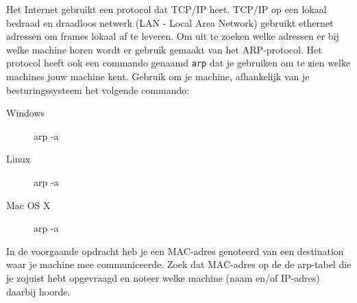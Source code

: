 Het Internet gebruikt een protocol dat TCP/IP heet. TCP/IP op een lokaal bedraad en draadloos netwerk (LAN - Local Area Network) gebruikt ethernet adressen om frames lokaal af te leveren. Om uit te zoeken welke adressen er bij welke machine horen wordt er gebruik gemaakt van het ARP-protocol. Het protocol heeft ook een commando genaamd \texttt{arp} dat je gebruiken om te zien welke machines jouw machine kent. Gebruik om je machine, afhankelijk van je besturingssysteem het volgende commando:
\begin{description}
\item[Windows] arp -a
\item[Linux] arp -a
\item[Mac OS X] arp -a
\end{description}

In de voorgaande opdracht heb je een MAC-adres genoteerd van een destination waar je machine mee communiceerde. Zoek dat MAC-adres op de de arp-tabel die je zojuist hebt opgevraagd en noteer welke machine (naam en/of IP-adres) daarbij hoorde.
